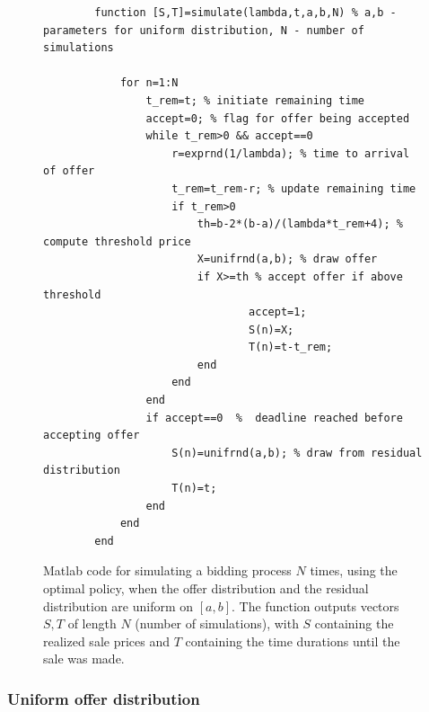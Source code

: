 \documentclass{article}
\numberwithin{equation}{section}
\begin{document}
\begin{figure}[h!]
	\begin{lstlisting}
		function [S,T]=simulate(lambda,t,a,b,N) % a,b - parameters for uniform distribution, N - number of simulations
		
    	  	for n=1:N 
	        	t_rem=t; % initiate remaining time
	        	accept=0; % flag for offer being accepted
	        	while t_rem>0 && accept==0
	             	r=exprnd(1/lambda); % time to arrival of offer
	            	t_rem=t_rem-r; % update remaining time
	            	if t_rem>0
	                 	th=b-2*(b-a)/(lambda*t_rem+4); % compute threshold price
	                 	X=unifrnd(a,b); % draw offer
	                 	if X>=th % accept offer if above threshold
	                         	accept=1;
	                        	S(n)=X;
	                        	T(n)=t-t_rem;
	                 	end  
	            	end
	        	end
	        	if accept==0  %  deadline reached before accepting offer
	            	S(n)=unifrnd(a,b); % draw from residual distribution
	            	T(n)=t;
    	    	end
	    	end
		end
		\end{lstlisting}
	\caption{Matlab code for simulating a bidding process $N$ times, using the optimal policy, when the offer distribution and the residual distribution are uniform on $[a,b]$. The function outputs vectors $S,T$ of length $N$ (number of simulations), with $S$ containing the realized sale prices and $T$ containing the time durations until the sale was made.}
	\label{fcode}
\end{figure}






\subsubsection{Uniform offer distribution}
\label{dist_uniform}
\end{document}
